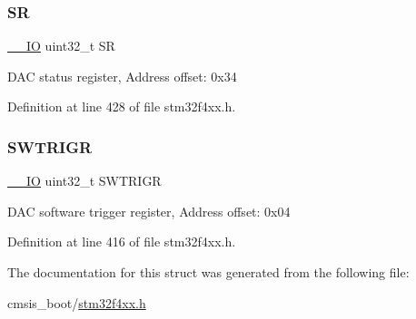 \subsubsection{\texorpdfstring{SR}{SR}}
{\footnotesize\ttfamily \hyperlink{group___c_m_s_i_s__core__definitions_gaec43007d9998a0a0e01faede4133d6be}{\+\_\+\+\_\+\+IO} uint32\+\_\+t SR}

D\+AC status register, Address offset\+: 0x34 

Definition at line 428 of file stm32f4xx.\+h.

\mbox{\label{struct_d_a_c___type_def_a896bbb7153af0b67ad772360feaceeb4}} 
\subsubsection{\texorpdfstring{S\+W\+T\+R\+I\+GR}{SWTRIGR}}
{\footnotesize\ttfamily \hyperlink{group___c_m_s_i_s__core__definitions_gaec43007d9998a0a0e01faede4133d6be}{\+\_\+\+\_\+\+IO} uint32\+\_\+t S\+W\+T\+R\+I\+GR}

D\+AC software trigger register, Address offset\+: 0x04 

Definition at line 416 of file stm32f4xx.\+h.



The documentation for this struct was generated from the following file\+:\begin{DoxyCompactItemize}
\item 
cmsis\+\_\+boot/\hyperlink{stm32f4xx_8h}{stm32f4xx.\+h}\end{DoxyCompactItemize}

